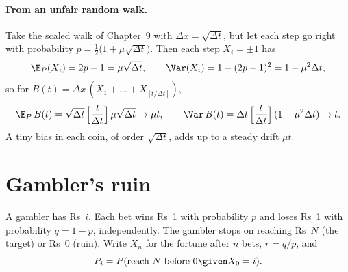 \begin{pic}
\end{pic}

\paragraph{From an unfair random walk.} Take the scaled walk of Chapter~9 with $\Delta x=\sqrt{\Delta t}$, but let each step go right with probability $p=\frac12\big(1+\mu\sqrt{\Delta t}\big)$. Then each step $X_i=\pm1$ has
\[
  \E_P(X_i)=2p-1=\mu\sqrt{\Delta t},\qquad \Var(X_i)=1-(2p-1)^2=1-\mu^2\Delta t,
\]
so for $B(t)=\Delta x\,(X_1+\dots+X_{[t/\Delta t]})$,
\[
  \E_P\,B(t)=\sqrt{\Delta t}\,\Big[\frac{t}{\Delta t}\Big]\,\mu\sqrt{\Delta t}\to\mu t,\qquad
  \Var\,B(t)=\Delta t\,\Big[\frac{t}{\Delta t}\Big]\,(1-\mu^2\Delta t)\to t .
\]
A tiny bias in each coin, of order $\sqrt{\Delta t}$, adds up to a steady drift $\mu t$.

\section{Gambler's ruin}

\begin{setup}
A gambler has Rs~$i$. Each bet wins Rs~1 with probability $p$ and loses Rs~1 with probability $q=1-p$, independently. The gambler stops on reaching Rs~$N$ (the target) or Rs~$0$ (ruin). Write $X_n$ for the fortune after $n$ bets, $r=q/p$, and
\[
  P_i=P(\text{reach }N\text{ before }0\given X_0=i).
\]
\end{setup}

